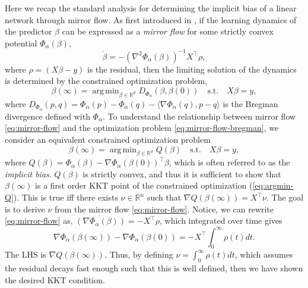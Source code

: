 \documentclass{article}
\theoremstyle{plain}
\theoremstyle{definition}
\theoremstyle{remark}
\DeclareMathOperator*{\argmin}{arg\,min}
\begin{document}
Here we recap the standard analysis for determining the implicit bias of a linear network through mirror flow.
%
As first introduced in \citet{gunasekar2018characterizing}, if the learning dynamics of the predictor $\beta$ can be expressed as a \emph{mirror flow} for some strictly convex potential $\Phi_\alpha(\beta)$,
\begin{equation}
    \label{eq:mirror-flow}
    \dot{\beta} = -\left(\nabla^2 \Phi_\alpha(\beta)\right)^{-1} X^\intercal \rho,
\end{equation}
where $\rho = (X\beta - y)$ is the residual, then the limiting solution of the dynamics is determined by the constrained optimization problem,
\begin{equation}
    \label{eq:mirror-flow-bregman}
    \beta(\infty) = \argmin_{\beta \in \mathbb{R}^d} D_{\Phi_{\alpha}}(\beta, \beta(0)) \quad \text{s.t.} \quad  X \beta = y,
\end{equation}
where $D_{\Phi_{\alpha}}(p,q) = \Phi_{\alpha}(p) - \Phi_{\alpha}(q) - \langle \nabla \Phi_{\alpha}(q), p-q\rangle$ is the Bregman divergence defined with $\Phi_{\alpha}$.
%
To understand the relationship between mirror flow \cref{eq:mirror-flow} and the optimization problem \cref{eq:mirror-flow-bregman}, we consider an equivalent constrained optimization problem
\begin{equation}
    \label{eq:argmin-Q}
    \beta(\infty) = \argmin_{\beta \in \mathbb{R}^d} Q(\beta) \quad \text{s.t.} \quad  X \beta = y,
\end{equation}
where $Q(\beta) = \Phi_\alpha(\beta) - \nabla \Phi_\alpha(\beta(0))^\intercal \beta$, which is often referred to as the \emph{implicit bias}.
%
$Q(\beta)$ is strictly convex, and thus it is sufficient to show that $\beta(\infty)$ is a first order KKT point of the constrained optimization (\ref{eq:argmin-Q}).
%
This is true iff there exists $\nu \in \mathbb{R}^n$ such that $\nabla Q(\beta(\infty)) = X^\intercal \nu$.
%
The goal is to derive $\nu$ from the mirror flow \cref{eq:mirror-flow}.
%
Notice, we can rewrite \cref{eq:mirror-flow} as, $\dot{\left(\nabla \Phi_\alpha(\beta)\right)} = -X^\intercal \rho$, which integrated over time gives
\begin{equation}
    \nabla \Phi_\alpha(\beta(\infty)) - \nabla \Phi_\alpha(\beta(0)) = -X^\intercal\int_0^\infty \rho(t)dt.
\end{equation}
The LHS is $\nabla Q(\beta(\infty))$.
%
Thus, by defining $\nu = \int_0^\infty \rho(t)dt$, which assumes the residual decays fast enough such that this is well defined, then we have shown the desired KKT condition.
\end{document}
